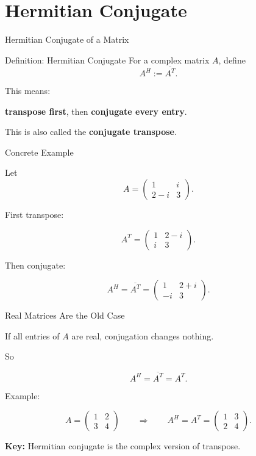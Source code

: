 \documentclass[10pt]{beamer}
\theoremstyle{definition}
\newcommand{\x}[1]{\alert{\textbf{#1}}}
\begin{document}
\section{Hermitian Conjugate}

\begin{frame}{Hermitian Conjugate of a Matrix}

\begin{block}{Definition: Hermitian Conjugate}
For a complex matrix $A$, define
$$
A^H:=\overline{A^T}.
$$
\end{block}

\vfill

This means:

\begin{center}
\x{transpose first}, then \x{conjugate every entry}.
\end{center}

\vfill

This is also called the \x{conjugate transpose}.

\end{frame}


\begin{frame}{Concrete Example}

Let
$$
A=\begin{pmatrix}
1&i\\
2-i&3
\end{pmatrix}.
$$

\vfill

First transpose:

$$
A^T=\begin{pmatrix}
1&2-i\\
i&3
\end{pmatrix}.
$$

\vfill\pause

Then conjugate:

$$
A^H=\overline{A^T}
=\begin{pmatrix}
1&2+i\\
-i&3
\end{pmatrix}.
$$

\end{frame}


\begin{frame}{Real Matrices Are the Old Case}

If all entries of $A$ are real, conjugation changes nothing.

\vfill

So

$$
A^H=\overline{A^T}=A^T.
$$

\vfill\pause

Example:

$$
A=\begin{pmatrix}1&2\\3&4\end{pmatrix}
\qquad\Longrightarrow\qquad
A^H=A^T=\begin{pmatrix}1&3\\2&4\end{pmatrix}.
$$

\vfill

\x{Key:} Hermitian conjugate is the complex version of transpose.

\end{frame}
\end{document}
